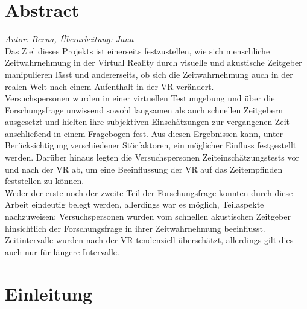\documentclass{Paper}
\begin{document}
\maketitle


\tableofcontents
\clearpage

\section*{Abstract}
	\textit{Autor: Berna, Überarbeitung: Jana}\\
Das Ziel dieses Projekts ist einerseits festzustellen, wie sich menschliche Zeitwahrnehmung in der Virtual Reality durch visuelle und akustische Zeitgeber manipulieren lässt und andererseits, ob sich die Zeitwahrnehmung auch in der realen Welt nach einem Aufenthalt in der VR verändert.\\
Versuchspersonen wurden in einer virtuellen Testumgebung und über die Forschungsfrage unwissend sowohl langsamen als auch schnellen Zeitgebern ausgesetzt und hielten ihre subjektiven Einschätzungen zur vergangenen Zeit anschließend in einem Fragebogen fest. Aus diesen Ergebnissen kann, unter Berücksichtigung verschiedener Störfaktoren, ein möglicher Einfluss festgestellt werden. Darüber hinaus legten die Versuchspersonen Zeiteinschätzungstests vor und nach der VR ab, um eine Beeinflussung der VR auf das Zeitempfinden feststellen zu können.\\
Weder der erste noch der zweite Teil der Forschungsfrage konnten durch diese Arbeit eindeutig belegt werden, allerdings war es möglich, Teilaspekte nachzuweisen: Versuchspersonen wurden vom schnellen akustischen Zeitgeber hinsichtlich der Forschungsfrage in ihrer Zeitwahrnehmung beeinflusst. Zeitintervalle wurden nach der VR tendenziell überschätzt, allerdings gilt dies auch nur für längere Intervalle. 


\section{Einleitung}
\end{document}
